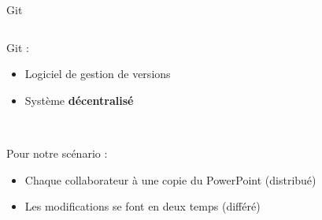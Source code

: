\begin{frame}{Git}
\begin{columns}
  \begin{column}{.55\textwidth}
  Git :
  \begin{itemize}
    \item Logiciel de gestion de versions
    \item Système \textbf{décentralisé} 
  \end{itemize}~

  Pour notre scénario :
  \begin{itemize}
    \item Chaque collaborateur à une copie du PowerPoint (distribué)
    \item Les modifications se font en deux temps (différé)
  \end{itemize}
  \end{column}


\end{columns}
\end{frame}
